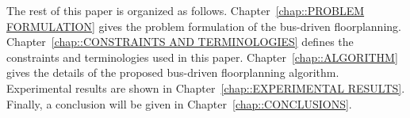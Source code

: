 The rest of this paper is organized as follows.
Chapter~\ref{chap::PROBLEM FORMULATION} gives the problem
formulation of the bus-driven floorplanning.
%
Chapter~\ref{chap::CONSTRAINTS AND TERMINOLOGIES} defines the
constraints and terminologies used in this paper.
%
Chapter~\ref{chap::ALGORITHM} gives the details of the proposed
bus-driven floorplanning algorithm.
%
Experimental results are shown in
Chapter~\ref{chap::EXPERIMENTAL RESULTS}.
%
Finally, a conclusion will be given in
Chapter~\ref{chap::CONCLUSIONS}.

\vfill\eject

\thispagestyle{empty}
\newpage
